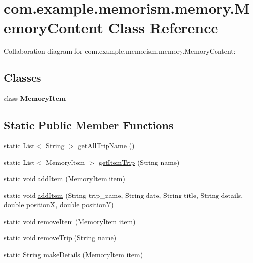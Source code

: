 \hypertarget{classcom_1_1example_1_1memorism_1_1memory_1_1_memory_content}{}\section{com.\+example.\+memorism.\+memory.\+Memory\+Content Class Reference}
\label{classcom_1_1example_1_1memorism_1_1memory_1_1_memory_content}


Collaboration diagram for com.\+example.\+memorism.\+memory.\+Memory\+Content\+:
\subsection*{Classes}
\begin{DoxyCompactItemize}
\item 
class {\bfseries Memory\+Item}
\end{DoxyCompactItemize}
\subsection*{Static Public Member Functions}
\begin{DoxyCompactItemize}
\item 
static List$<$ String $>$ \hyperlink{classcom_1_1example_1_1memorism_1_1memory_1_1_memory_content_abee14d3117afebf9c4dbbe4e42a67681}{get\+All\+Trip\+Name} ()
\item 
static List$<$ Memory\+Item $>$ \hyperlink{classcom_1_1example_1_1memorism_1_1memory_1_1_memory_content_a344d7fd205ff5645a7b0e37d71006ef0}{get\+Item\+Trip} (String name)
\item 
static void \hyperlink{classcom_1_1example_1_1memorism_1_1memory_1_1_memory_content_aa4de84ed8cc74b2a05eee78be9006beb}{add\+Item} (Memory\+Item item)
\item 
static void \hyperlink{classcom_1_1example_1_1memorism_1_1memory_1_1_memory_content_a830cbb9924e5992dccb310b7d3ef484d}{add\+Item} (String trip\+\_\+name, String date, String title, String details, double positionX, double positionY)
\item 
static void \hyperlink{classcom_1_1example_1_1memorism_1_1memory_1_1_memory_content_a0712c96d927ddb6c68202f9ea24bea5c}{remove\+Item} (Memory\+Item item)
\item 
static void \hyperlink{classcom_1_1example_1_1memorism_1_1memory_1_1_memory_content_a4641b5327eb70f1d7754d77aa71bfe0b}{remove\+Trip} (String name)
\item 
static String \hyperlink{classcom_1_1example_1_1memorism_1_1memory_1_1_memory_content_a4e7cf028fd6d81395968bc10f42a7643}{make\+Details} (Memory\+Item item)
\end{DoxyCompactItemize}
